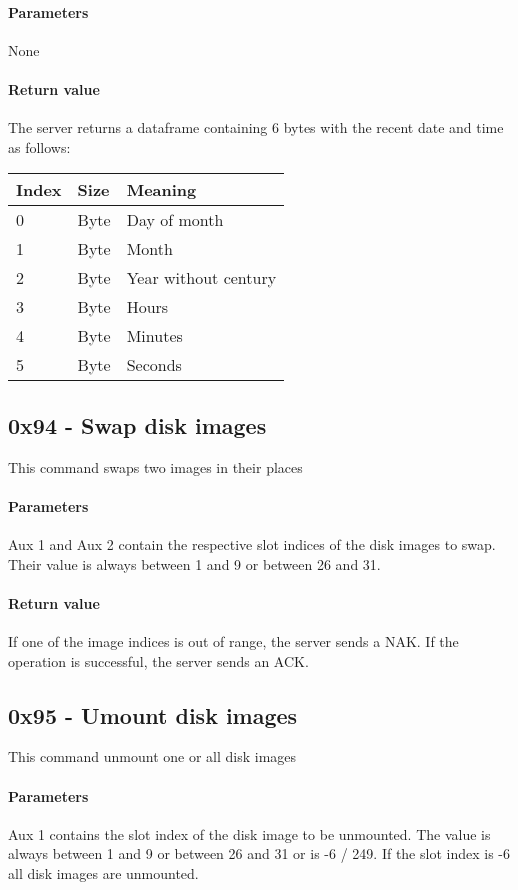 \documentclass[10pt]{article}
\begin{document}
\paragraph{Parameters}
None

\paragraph{Return value}
The server returns a dataframe containing 6 bytes with the recent date and time as follows:\\

\begin{tabular}{l|l|l}
Index & Size & Meaning \\ \hline
0 & Byte & Day of month \\
1 & Byte & Month \\
2 & Byte & Year without century \\
3 & Byte & Hours \\
4 & Byte & Minutes \\
5 & Byte & Seconds
\end{tabular}

\subsection{0x94 - Swap disk images}
This command swaps two images in their places

\paragraph{Parameters}
Aux 1 and Aux 2 contain the respective slot indices of the disk images to swap. Their value is always between 1 and 9 or between 26 and 31.

\paragraph{Return value}
If one of the image indices is out of range, the server sends a NAK.
If the operation is successful, the server sends an ACK.

\subsection{0x95 - Umount disk images}
This command unmount one or all disk images

\paragraph{Parameters}
Aux 1 contains the slot index of the disk image to be unmounted. The value is always between 1 and 9 or between 26 and 31 or is -6 / 249. If the slot index is -6 all disk images are unmounted.
\end{document}
